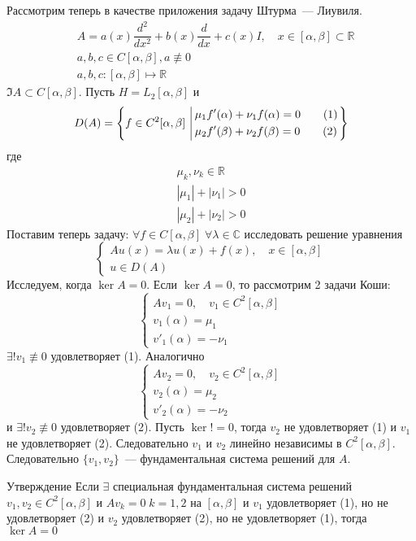 \documentclass[14pt]{extarticle}
\begin{document}
Рассмотрим теперь в качестве приложения задачу Штурма~--- Лиувиля.
\begin{align*}
    &A = a(x)\dfrac{d^2}{dx^2} + b(x)\dfrac{d}{dx} + c(x)I,\quad x \in [\alpha, \beta] \subset 
    \mathbb R\\
    &a, b, c \in C[\alpha, \beta], a \not\equiv 0\\
    &a, b, c : [\alpha, \beta] \mapsto \mathbb R
\end{align*}
$\Im A \subset C[\alpha, \beta]$.
Пусть $H = L_2[\alpha, \beta]$ и 
$$
D(A) = \left\{f \in C^2[\alpha, \beta] \left\arrowvert
\begin{aligned}
    &\mu_1f'(\alpha) + \nu_1f(\alpha) = 0 \qquad (1)\\
    &\mu_2  f'(\beta) + \nu_2  f(\beta) = 0 \qquad (2)
\end{aligned}
\right.
\right\}
$$
где
\begin{gather*}
    \mu_k, \nu_k \in \mathbb R\\
    |\mu_1| + |\nu_1| > 0\\
    |\mu_2| + |\nu_2| > 0
\end{gather*}
Поставим теперь задачу: $\forall f \in C[\alpha, \beta]\; \forall \lambda \in \mathbb C$
исследовать решение уравнения
$$
\left\{
\begin{array}{l}
    Au(x) = \lambda u(x) + f(x), \quad x \in [\alpha, \beta]\\
    u \in D(A)
\end{array}
\right.
$$
Исследуем, когда $\ker A = 0$.
Если $\ker A = 0$, то рассмотрим 2 задачи Коши:
$$
\left\{
\begin{array}{l}
    Av_1 = 0, \quad v_1 \in C^2[\alpha, \beta]\\
    v_1(\alpha) = \mu_1\\
    v'_1(\alpha) = -\nu_1
\end{array}
\right.
$$
$\exists! v_1 \not\equiv 0$ удовлетворяет (1).
Аналогично
$$
\left\{
\begin{array}{l}
    Av_2 = 0, \quad v_2 \in C^2[\alpha, \beta]\\
    v_2(\alpha) = \mu_2\\
    v'_2(\alpha) = -\nu_2
\end{array}
\right.
$$
и $\exists! v_2 \not\equiv 0$ удовлетворяет (2).
Пусть $\ker ! = 0$, тогда $v_2$ не удовлетворяет (1) и $v_1$ не удовлетворяет (2).
Следовательно $v_1$ и $v_2$ линейно независимы в $C^2[\alpha, \beta]$.
Следовательно $\{v_1, v_2\}$~--- фундаментальная система решений для $A$.
\begin{MathCl}{Утверждение}
    Если $\exists$ специальная фундаментальная система решений $v_1 ,v_2 \in C^2[\alpha,
    \beta]$ и $Av_k = 0\; k=1,2$ на $[\alpha, \beta]$ и $v_1$ удовлетворяет (1), но не
    удовлетворяет (2) и $v_2$ удовлетворяет (2), но не удовлетворяет (1), тогда
    $\ker A = 0$
\end{MathCl}
\end{document}
